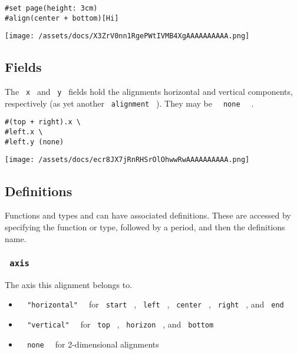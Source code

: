 \begin{verbatim}
#set page(height: 3cm)
#align(center + bottom)[Hi]
\end{verbatim}

\texttt{[image: /assets/docs/X3ZrV0nn1RgePWtIVMB4XgAAAAAAAAAA.png]}

\subsection{Fields}\label{fields}

The \texttt{\ x\ } and \texttt{\ y\ } fields hold the
alignment\textquotesingle s horizontal and vertical components,
respectively (as yet another \texttt{\ alignment\ } ). They may be
\texttt{\ }{\texttt{\ none\ }}\texttt{\ } .

\begin{verbatim}
#(top + right).x \
#left.x \
#left.y (none)
\end{verbatim}

\texttt{[image: /assets/docs/ecr8JX7jRnRHSrOlOhwwRwAAAAAAAAAA.png]}

\subsection{\texorpdfstring{{ Definitions
}}{ Definitions }}\label{definitions}

\label{definitions-tooltip}
Functions and types and can have associated definitions. These are
accessed by specifying the function or type, followed by a period, and
then the definition\textquotesingle s name.

\subsubsection{\texorpdfstring{\texttt{\ axis\ }}{ axis }}\label{definitions-axis}

The axis this alignment belongs to.

\begin{itemize}
\tightlist
\item
  \texttt{\ }{\texttt{\ "horizontal"\ }}\texttt{\ } for
  \texttt{\ start\ } , \texttt{\ left\ } , \texttt{\ center\ } ,
  \texttt{\ right\ } , and \texttt{\ end\ }
\item
  \texttt{\ }{\texttt{\ "vertical"\ }}\texttt{\ } for \texttt{\ top\ } ,
  \texttt{\ horizon\ } , and \texttt{\ bottom\ }
\item
  \texttt{\ }{\texttt{\ none\ }}\texttt{\ } for 2-dimensional alignments
\end{itemize}


